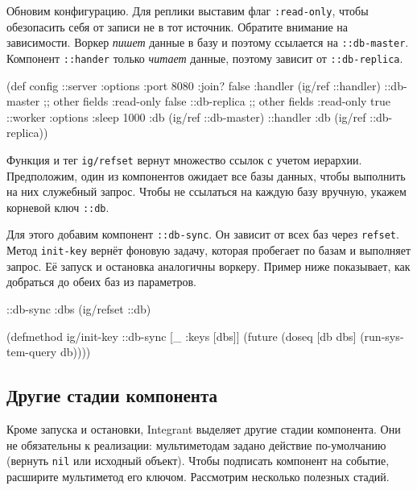 
Обновим конфигурацию. Для реплики выставим флаг \verb|:read-only|, чтобы
обезопасить себя от записи не в тот источник. Обратите внимание на
зависимости. Воркер \emph{пишет} данные в базу и поэтому ссылается на
\verb|::db-master|. Компонент \verb|::hander| только \emph{читает} данные,
поэтому зависит от \verb|::db-replica|.

\begin{english}
  \begin{clojure}
(def config
  {::server {:options {:port 8080 :join? false}
             :handler (ig/ref ::handler)}
   ::db-master {;; other fields
                :read-only false}
   ::db-replica {;; other fields
                 :read-only true}
   ::worker {:options {:sleep 1000}
             :db (ig/ref ::db-master)}
   ::handler {:db (ig/ref ::db-replica)}})
  \end{clojure}
\end{english}

Функция и тег \verb|ig/refset| вернут множество ссылок с учетом
иерархии. Предположим, один из компонентов ожидает все базы данных, чтобы
выполнить на них служебный запрос. Чтобы не ссылаться на каждую базу вручную,
укажем корневой ключ \verb|::db|.


Для этого добавим компонент \verb|::db-sync|. Он зависит от всех баз через
\verb|refset|. Метод \verb|init-key| вернёт фоновую задачу, которая
пробегает по базам и выполняет запрос. Её запуск и остановка аналогичны
воркеру. Пример ниже показывает, как добраться до обеих баз из параметров.

\begin{english}
  \begin{clojure}
{::db-sync {:dbs (ig/refset ::db)}}

(defmethod ig/init-key ::db-sync
  [_ {:keys [dbs]}]
  (future
    (doseq [db dbs]
      (run-system-query db))))
  \end{clojure}
\end{english}

\subsection{Другие стадии компонента}


Кроме запуска и остановки, Integrant выделяет другие стадии компонента. Они не
обязательны к реализации: мультиметодам задано действие по-умолчанию (вернуть
\verb|nil| или исходный объект). Чтобы подписать компонент на событие,
расширите мультиметод его ключом. Рассмотрим несколько полезных стадий.

